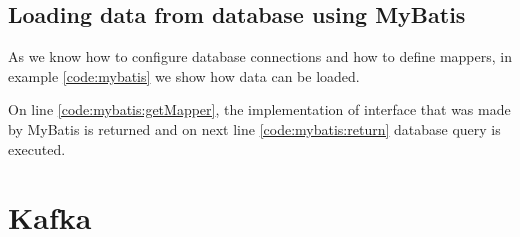 \subsection{Loading data from database using MyBatis \label{mybatis:run}}

As we know how to configure database connections and how to define mappers,
in example \ref{code:mybatis} we show how data can be loaded.

On line \ref{code:mybatis:getMapper}, the implementation of  interface
that was made by MyBatis is returned and on next line \ref{code:mybatis:return} database query is executed.




\section{Kafka}



